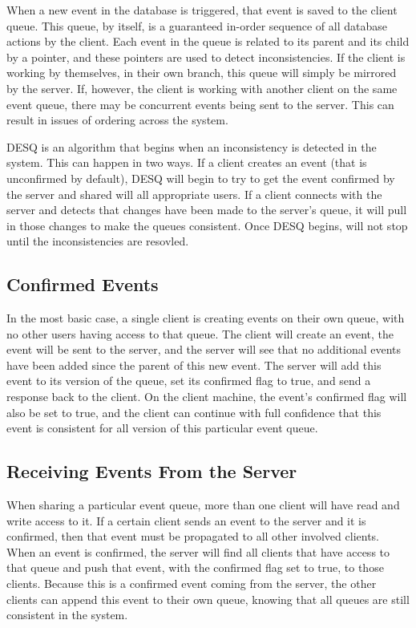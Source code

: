 When a new event in the database is triggered, that event is saved to the client queue. This queue, by itself, is a guaranteed in-order sequence of all database actions by the client. Each event in the queue is related to its parent and its child by a pointer, and these pointers are used to detect inconsistencies. If the client is working by themselves, in their own branch, this queue will simply be mirrored by the server. If, however, the client is working with another client on the same event queue, there may be concurrent events being sent to the server. This can result in issues of ordering across the system.

DESQ is an algorithm that begins when an inconsistency is detected in the system. This can happen in two ways. If a client creates an event (that is unconfirmed by default), DESQ will begin to try to get the event confirmed by the server and shared will all appropriate users. If a client connects with the server and detects that changes have been made to the server's queue, it will pull in those changes to make the queues consistent. Once DESQ begins, will not stop until the inconsistencies are resovled. 

\subsection{Confirmed Events}

In the most basic case, a single client is creating events on their own queue, with no other users having access to that queue. The client will create an event, the event will be sent to the server, and the server will see that no additional events have been added since the parent of this new event. The server will add this event to its version of the queue, set its confirmed flag to true, and send a response back to the client. On the client machine, the event's confirmed flag will also be set to true, and the client can continue with full confidence that this event is consistent for all version of this particular event queue.

\subsection{Receiving Events From the Server}

When sharing a particular event queue, more than one client will have read and write access to it. If a certain client sends an event to the server and it is confirmed, then that event must be propagated to all other involved clients. When an event is confirmed, the server will find all clients that have access to that queue and push that event, with the confirmed flag set to true, to those clients. Because this is a confirmed event coming from the server, the other clients can append this event to their own queue, knowing that all queues are still consistent in the system.

